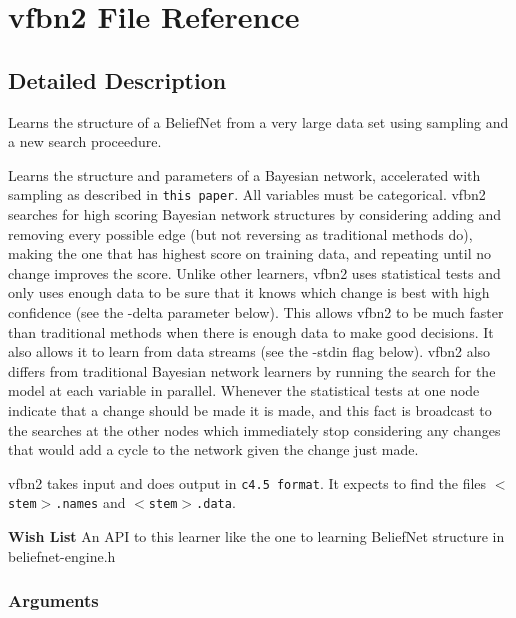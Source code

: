 \section{vfbn2 File Reference}
\label{vfbn2}


\subsection{Detailed Description}
Learns the structure of a Belief\-Net from a very large data set using sampling and a new search proceedure. 

Learns the structure and parameters of a Bayesian network, accelerated with sampling as described in {\tt this paper}. All variables must be categorical. vfbn2 searches for high scoring Bayesian network structures by considering adding and removing every possible edge (but not reversing as traditional methods do), making the one that has highest score on training data, and repeating until no change improves the score. Unlike other learners, vfbn2 uses statistical tests and only uses enough data to be sure that it knows which change is best with high confidence (see the -delta parameter below). This allows vfbn2 to be much faster than traditional methods when there is enough data to make good decisions. It also allows it to learn from data streams (see the -stdin flag below). vfbn2 also differs from traditional Bayesian network learners by running the search for the model at each variable in parallel. Whenever the statistical tests at one node indicate that a change should be made it is made, and this fact is broadcast to the searches at the other nodes which immediately stop considering any changes that would add a cycle to the network given the change just made.

vfbn2 takes input and does output in {\tt c4.5 format}. It expects to find the files {\tt $<$stem$>$.names} and {\tt $<$stem$>$.data}.

\begin{Desc}
\item[{\bf Wish List}]An API to this learner like the one to learning Belief\-Net structure in beliefnet-engine.h \end{Desc}
\subsubsection*{Arguments}

